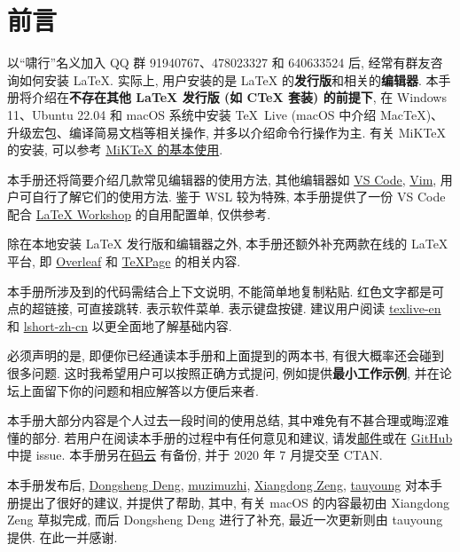 
\chapter*{前言}

以``啸行''名义加入 QQ 群 91940767、478023327 和 640633524 后,
经常有群友咨询如何安装 \LaTeX.
实际上,
用户安装的是 \LaTeX{} 的\textbf{发行版}和相关的\textbf{编辑器}.
本手册将介绍在\textbf{不存在其他 \LaTeX{} 发行版 (如 C\TeX{} 套装) 的前提下},
在 Windows 11、Ubuntu 22.04 和 macOS 系统中安装
\TeX{}~Live (macOS 中介绍 Mac\TeX)、升级宏包、编译简易文档等相关操作,
并多以介绍命令行操作为主.
有关 MiK\TeX{} 的安装,
可以参考 \href{https://camusecao.top/2021-06-16/MiKTeX/}{MiK\TeX{} 的基本使用}.

本手册还将简要介绍几款常见编辑器的使用方法,
其他编辑器如 \href{https://code.visualstudio.com/}{VS Code},
\href{https://www.vim.org/}{Vim},
用户可自行了解它们的使用方法.
鉴于 WSL 较为特殊,
本手册提供了一份 VS Code 配合
\href{https://marketplace.visualstudio.com/items?itemName=James-Yu.latex-workshop}{LaTeX Workshop}
的自用配置单,
仅供参考.

除在本地安装 \LaTeX{} 发行版和编辑器之外,
本手册还额外补充两款在线的 \LaTeX 平台,
即 \href{http://www.overleaf.com}{Overleaf} 和 \href{https://www.texpage.com/}{TeXPage} 的相关内容.

本手册所涉及到的代码需结合上下文说明, 不能简单地复制粘贴. 红色文字都是可点的超链接, 可直接跳转.
 表示软件菜单.  表示键盘按键.
建议用户阅读 \href{https://www.tug.org/texlive/doc/texlive-en/texlive-en.pdf}{texlive-en}
和 \href{http://mirrors.ctan.org/info/lshort/chinese/lshort-zh-cn.pdf}{lshort-zh-cn}
以更全面地了解基础内容.

必须声明的是,
即便你已经通读本手册和上面提到的两本书,
有很大概率还会碰到很多问题.
这时我希望用户可以按照正确方式提问,
例如提供\textbf{最小工作示例},
并在论坛上面留下你的问题和相应解答以方便后来者.

本手册大部分内容是个人过去一段时间的使用总结, 其中难免有不甚合理或晦涩难懂的部分. 
若用户在阅读本手册的过程中有任何意见和建议,
请发\href{mailto:ranwang.osbert@outlook.com}{邮件}或在
\href{https://github.com/OsbertWang/install-latex-guide-zh-cn/}{GitHub} 中提 issue.
本手册另在\href{https://gitee.com/OsbertWang/install-latex-guide-zh-cn}{码云}%
有备份,
并于 2020 年 7 月提交至 CTAN.


本手册发布后,
\href{https://github.com/EthanDeng}{Dongsheng Deng},
\href{https://github.com/muzimuzhi}{muzimuzhi},
\href{https://github.com/stone-zeng}{Xiangdong Zeng},
\href{https://github.com/tauyoungsama}{tauyoung}
对本手册提出了很好的建议, 并提供了帮助,
其中, 有关 macOS 的内容最初由 Xiangdong Zeng 草拟完成,
而后 Dongsheng Deng 进行了补充,
最近一次更新则由 tauyoung 提供.
在此一并感谢.

